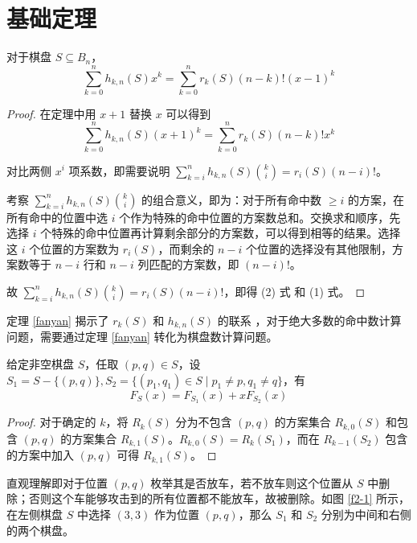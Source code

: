 \documentclass{noithesis}
\begin{document}
	\section{基础定理}
	
	\begin{theorem}\label{fanyan}
		对于棋盘 $S \subseteq B_n$，\begin{equation}
		\sum_{k=0}^n h_{k,n}(S)x^k = \sum_{k=0}^n r_k(S)(n-k)!(x-1)^k
		\end{equation}
	\end{theorem}
	\begin{proof}
	在定理中用 $x+1$ 替换 $x$ 可以得到\begin{equation}
	\sum_{k=0}^n h_{k,n}(S)(x+1)^k = \sum_{k=0}^n r_k(S)(n-k)!x^k
	\end{equation}
	
	对比两侧 $x^i$ 项系数，即需要说明 $\sum_{k=i}^n h_{k,n}(S)\binom{k}{i} = r_i(S)(n-i)!$。
	
	考察 $\sum_{k=i}^n h_{k,n}(S)\binom{k}{i}$ 的组合意义，即为：对于所有命中数 $\geq i$ 的方案，在所有命中的位置中选 $i$ 个作为特殊的命中位置的方案数总和。交换求和顺序，先选择 $i$ 个特殊的命中位置再计算剩余部分的方案数，可以得到相等的结果。选择这 $i$ 个位置的方案数为 $r_i(S)$，而剩余的 $n-i$ 个位置的选择没有其他限制，方案数等于 $n-i$ 行和 $n-i$ 列匹配的方案数，即 $(n-i)!$。
	
	故 $\sum_{k=i}^n h_{k,n}(S)\binom{k}{i} = r_i(S)(n-i)!$，即得 (2) 式 和 (1) 式。
	\end{proof}
	
	定理 \ref{fanyan} 揭示了 $r_k(S)$ 和 $h_{k,n}(S)$ 的联系 ，对于绝大多数的命中数计算问题，需要通过定理 \ref{fanyan} 转化为棋盘数计算问题。
	
	\begin{theorem}\label{zhankai}
		给定非空棋盘 $S$，任取 $(p,q) \in S$，设 $S_1 = S - \{(p,q)\} , S_2 = \{(p_1,q_1) \in S \mid p_1 \neq p,q_1 \neq q \}$，有\begin{equation}
			F_S(x) = F_{S_1}(x) + xF_{S_2}(x)
		\end{equation}
	\end{theorem}
	\begin{proof}
		对于确定的 $k$，将 $R_k(S)$ 分为不包含 $(p,q)$ 的方案集合 $R_{k,0}(S)$ 和包含 $(p,q)$ 的方案集合 $R_{k,1}(S)$。$R_{k,0}(S) = R_k(S_1)$，而在 $R_{k-1}(S_2)$ 包含的方案中加入 $(p,q)$ 可得 $R_{k,1}(S)$。
	\end{proof}
	
	直观理解即对于位置 $(p,q)$ 枚举其是否放车，若不放车则这个位置从 $S$ 中删除；否则这个车能够攻击到的所有位置都不能放车，故被删除。如图 \ref{f2-1} 所示，在左侧棋盘 $S$ 中选择 $(3,3)$ 作为位置 $(p,q)$，那么 $S_1$ 和 $S_2$ 分别为中间和右侧的两个棋盘。
	
\end{document}
